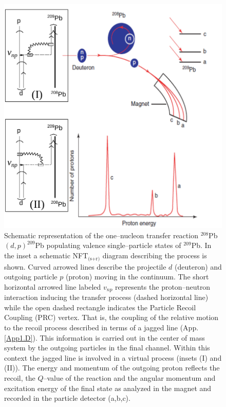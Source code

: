 \begin{figure}[h!]
\centerline {
\includegraphics*[width=12cm]{introduccion/figs/figintro2}
}
\caption{Schematic  representation of the one--nucleon transfer reaction $^{208}$Pb$(d,p)^{209}$Pb populating  valence single--particle states of $^{209}$Pb. In the inset a schematic NFT$_{\text{(s+r)}}$ diagram describing the process is shown. Curved arrowed lines describe the projectile $d$ (deuteron) and outgoing particle $p$ (proton) moving in the continuum. The short horizontal arrowed line labeled $v_{np}$ represents the proton--neutron interaction inducing the transfer process (dashed horizontal line) while the  open dashed rectangle indicates the Particle Recoil Coupling (PRC) vertex. That is,  the coupling of the relative motion to the recoil process described in terms of a jagged line (App. \ref{App1.D}). This information is carried out in the center of mass system by the outgoing particles in the final channel. Within this context the jagged line is involved in a virtual process (insets (I) and (II)). The energy and momentum of the outgoing proton reflects the recoil, the  $Q$--value of the reaction and the angular momentum and excitation energy of the final state as analyzed in the magnet and recorded in the particle detector (a,b,c).}
\label{figintro2}
\end{figure}
